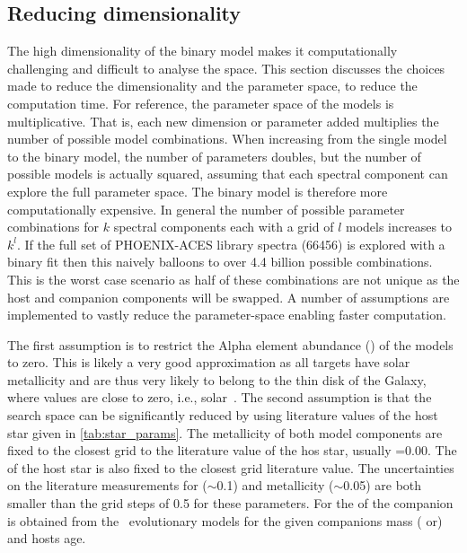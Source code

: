 \subsection{Reducing dimensionality}
\label{subsec:reduce-params}
The high dimensionality of the binary model makes it computationally challenging and difficult to analyse the \textchisquared{} space.
This section discusses the choices made to reduce the dimensionality and the parameter space, to reduce the computation time.
For reference, the parameter space of the models is multiplicative.
That is, each new dimension or parameter added multiplies the number of possible model combinations.
When increasing from the single model to the binary model, the number of parameters doubles, but the number of possible models is actually squared, assuming that each spectral component can explore the full parameter space.
The binary model is therefore more computationally expensive.
In general the number of possible parameter combinations for \(k\) spectral components each with a grid of \(l\) models increases to \({k}^{l}\).
If the full set of {PHOENIX-ACES} library spectra (66456) is explored with a binary fit then this naively balloons to over 4.4 billion possible combinations.
This is the worst case scenario as half of these combinations are not unique as the host and companion components will be swapped.
A number of assumptions are implemented to vastly reduce the parameter-space enabling faster computation.

The first assumption is to restrict the Alpha element abundance (\alphafe{}) of the models to zero.
This is likely a very good approximation as all  targets have solar metallicity and are thus very likely to belong to the thin disk of the Galaxy, where \alphafe{} values are close to zero, i.e., solar~\citet[e.g.][]{adibekyan_chemical_2012}.
The second assumption is that the search space can be significantly reduced by using literature values of the host star given in \cref{tab:star_params}.
The metallicity of both model components are fixed to the closest grid to the literature value of the hos star, usually \feh{}=0.00.
The \logg{} of the host star is also fixed to the closest grid literature value.
The uncertainties on the literature measurements for \logg{} (\(\sim\)0.1) and metallicity (\(\sim\)0.05) are both smaller than the grid steps of 0.5 for these parameters.
For the \logg{} of the companion is obtained from the~\citet{baraffe_evolutionary_2003,baraffe_new_2015} evolutionary models for the given companions mass (\Mtwo{} or\Mtwosini{}) and hosts age.

